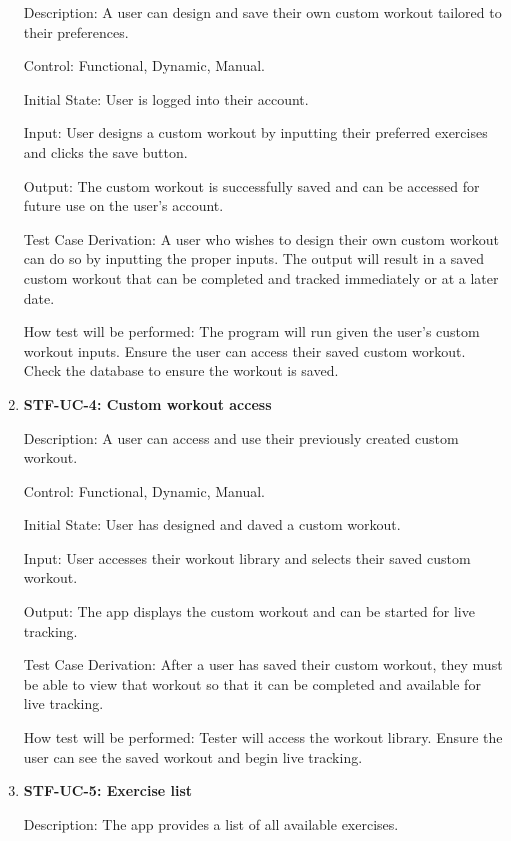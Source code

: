 \documentclass[12pt, titlepage]{article}
\begin{document}
\begin{enumerate}
        Description: A user can design and save their own custom workout tailored to their preferences.

        Control: Functional, Dynamic, Manual.

        Initial State: User is logged into their account.

        Input: User designs a custom workout by inputting their preferred exercises and clicks the save button.

        Output: The custom workout is successfully saved and can be accessed for future use on the user’s account.

        Test Case Derivation: A user who wishes to design their own custom workout can do so by inputting the proper inputs. The output will result in a saved custom workout that can be completed and tracked immediately or at a later date.

        How test will be performed: The program will run given the user’s custom workout inputs. Ensure the user can access their saved custom workout. Check the database to ensure the workout is saved.

        \item{\textbf{STF-UC-4: Custom workout access}\\}

        Description: A user can access and use their previously created custom workout.

        Control: Functional, Dynamic, Manual.

        Initial State: User has designed and daved a custom workout.

        Input: User accesses their workout library and selects their saved custom workout.

        Output: The app displays the custom workout and can be started for live tracking.

        Test Case Derivation: After a user has saved their custom workout, they must be able to view that workout so that it can be completed and available for live tracking.

        How test will be performed: Tester will access the workout library. Ensure the user can see the saved workout and begin live tracking.

        \item{\textbf{STF-UC-5: Exercise list}\\}

        Description: The app provides a list of all available exercises.


\end{enumerate}
\end{document}
